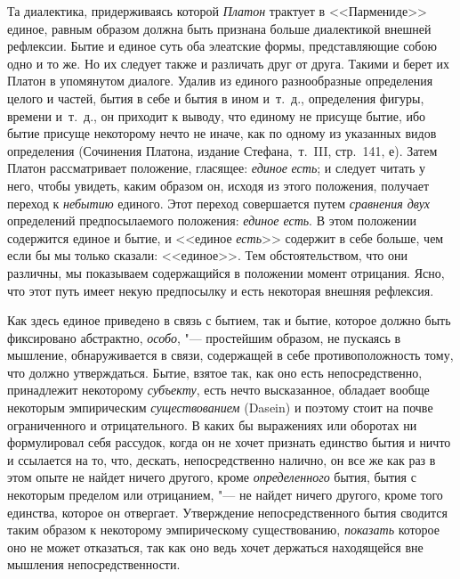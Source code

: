 Та диалектика, придерживаясь которой {\em Платон}
трактует в <<Пармениде>> единое, равным образом должна быть признана больше
диалектикой внешней рефлексии. Бытие и единое суть оба элеатские формы,
представляющие собою одно и то же. Но их следует также и различать друг от
друга. Такими и берет их Платон в упомянутом диалоге. Удалив из единого
разнообразные определения целого и частей, бытия в себе и бытия в ином
и~т.~д., определения фигуры, времени и~т.~д., он приходит к выводу, что
единому не присуще бытие, ибо бытие присуще некоторому нечто не иначе, как
по одному из указанных видов определения (Сочинения Платона, издание
Стефана,~т.~III,
стр.~141, е). Затем Платон рассматривает
положение, гласящее: {\em единое}
{\em есть}; и следует читать у него, чтобы увидеть,
каким образом он, исходя из этого положения, получает переход к
{\em небытию} единого. Этот переход совершается путем
{\em сравнения двух} определений предпосылаемого
положения: {\em единое есть}. В этом положении
содержится единое и бытие, и <<единое {\em есть}>>
содержит в себе больше, чем если бы мы только сказали: <<единое>>. Тем
обстоятельством, что они различны, мы показываем содержащийся в положении
момент отрицания. Ясно, что этот путь имеет некую предпосылку и есть
некоторая внешняя рефлексия.

Как здесь единое приведено в связь с бытием, так и бытие, которое должно
быть фиксировано абстрактно, {\em особо}, "--- простейшим
образом, не пускаясь в мышление, обнаруживается в связи, содержащей в себе
противоположность тому, что должно утверждаться. Бытие, взятое так, как оно
есть непосредственно, принадлежит некоторому
{\em субъекту}, есть нечто высказанное, обладает вообще
некоторым эмпирическим {\em существованием} (Dasein) и
поэтому стоит на почве ограниченного и отрицательного. В каких бы
выражениях или оборотах ни формулировал себя рассудок, когда он не хочет
признать единство бытия и ничто и ссылается на то, что, дескать,
непосредственно налично, он все же как раз в этом опыте не найдет ничего
другого, кроме {\em определенного} бытия, бытия с
некоторым пределом или отрицанием, "--- не найдет ничего другого, кроме того
единства, которое он отвергает. Утверждение непосредственного бытия
сводится таким образом к некоторому эмпирическому существованию,
{\em показать} которое оно не может отказаться, так как
оно ведь хочет держаться находящейся вне мышления непосредственности.

